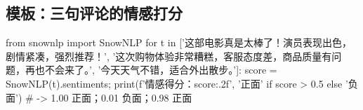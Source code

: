 \subsection{模板：三句评论的情感打分}
\begin{PYQcode}
from snownlp import SnowNLP
for t in ['这部电影真是太棒了！演员表现出色，剧情紧凑，强烈推荐！', '这次购物体验非常糟糕，客服态度差，商品质量有问题，再也不会来了。', '今天天气不错，适合外出散步。']:
    score = SnowNLP(t).sentiments; print(f'情感得分：{score:.2f}', '正面' if score > 0.5 else '负面')   # -> 1.00 正面；0.01 负面；0.98 正面
\end{PYQcode}

